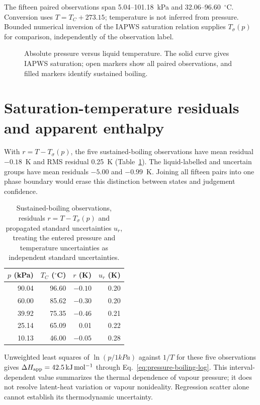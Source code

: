 The fifteen paired observations span 5.04--101.18~kPa and 32.06--96.60~$^\circ$C. Conversion uses $T=T_C+273.15$; temperature is not inferred from pressure. Bounded numerical inversion of the IAPWS saturation relation\cite{iapws1992} supplies $T_\sigma(p)$ for comparison, independently of the observation label.

\begin{figure}[t]
\centering

\caption{Absolute pressure versus liquid temperature. The solid curve gives IAPWS saturation; open markers show all paired observations, and filled markers identify sustained boiling.}
\label{fig:pressure-boiling-data}
\end{figure}

\section{Saturation-temperature residuals and apparent enthalpy}
With $r=T-T_\sigma(p)$, the five sustained-boiling observations have mean residual $-0.18$~K and RMS residual 0.25~K (Table~\ref{tab:pressure-boiling-results}). The liquid-labelled and uncertain groups have mean residuals $-5.00$ and $-0.99$~K. Joining all fifteen pairs into one phase boundary would erase this distinction between states and judgement confidence.

\begin{table}[t]
\caption{Sustained-boiling observations, residuals $r=T-T_\sigma(p)$ and propagated standard uncertainties $u_r$, treating the entered pressure and temperature uncertainties as independent standard uncertainties.}
\label{tab:pressure-boiling-results}
\centering\footnotesize
\begin{tabular}{@{}rrrr@{}}
\toprule
$p$ (kPa)&$T_C$ ($^\circ$C)&$r$ (K)&$u_r$ (K)\\
\midrule
90.04&96.60&$-0.10$&0.20\\
60.00&85.62&$-0.30$&0.20\\
39.92&75.35&$-0.46$&0.21\\
25.14&65.09&0.01&0.22\\
10.13&46.00&$-0.05$&0.28\\
\bottomrule
\end{tabular}
\end{table}

Unweighted least squares of $\ln(p/1\unit{kPa})$ against $1/T$ for these five observations gives $\Delta H_{\rm app}=42.5\,\mathrm{kJ\,mol^{-1}}$ through Eq.~\eqref{eq:pressure-boiling-log}. This interval-dependent value summarizes the thermal dependence of vapour pressure; it does not resolve latent-heat variation or vapour nonideality. Regression scatter alone cannot establish its thermodynamic uncertainty.

